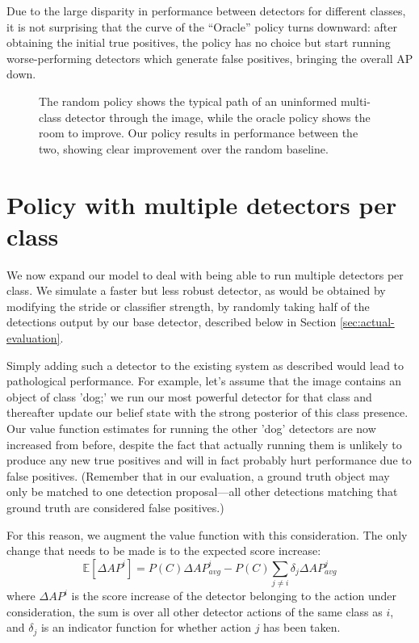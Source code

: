 Due to the large disparity in performance between detectors for different classes, it is not surprising that the curve of the ``Oracle'' policy turns downward: after obtaining the initial true positives, the policy has no choice but start running worse-performing detectors which generate false positives, bringing the overall AP down.

\begin{figure}[htb]
  \caption{\label{fig:1det} The random policy shows the typical path of an uninformed multi-class detector through the image, while the oracle policy shows the room to improve. Our policy results in performance between the two, showing clear improvement over the random baseline.}
\end{figure}

\section{Policy with multiple detectors per class} \label{sec:multidetector}
We now expand our model to deal with being able to run multiple detectors per class.
We simulate a faster but less robust detector, as would be obtained by modifying the stride or classifier strength, by randomly taking half of the detections output by our base detector, described below in Section \ref{sec:actual-evaluation}.

Simply adding such a detector to the existing system as described would lead to pathological performance.
For example, let's assume that the image contains an object of class 'dog;' we run our most powerful detector for that class and thereafter update our belief state with the strong posterior of this class presence.
Our value function estimates for running the other 'dog' detectors are now increased from before, despite the fact that actually running them is unlikely to produce any new true positives and will in fact probably hurt performance due to false positives.
(Remember that in our evaluation, a ground truth object may only be matched to one detection proposal---all other detections matching that ground truth are considered false positives.)

For this reason, we augment the value function with this consideration.
The only change that needs to be made is to the expected score increase:
\begin{equation}\label{eq:multiclass}
\mathbb{E}[\Delta AP^i] = P(C)\Delta AP^i_{avg} - P(C)\sum_{j \neq i} \delta_j \Delta AP^j_{avg}
\end{equation}
where $\Delta AP^i$ is the score increase of the detector belonging to the action under consideration, the sum is over all other detector actions of the same class as $i$, and $\delta_j$ is an indicator function for whether action $j$ has been taken.

